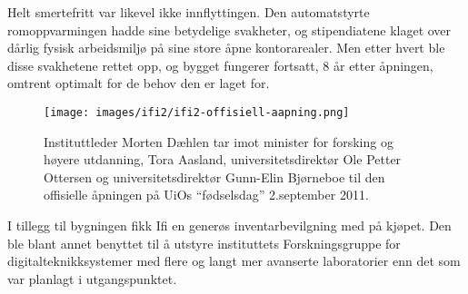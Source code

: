 Helt smertefritt var likevel ikke innflyttingen. Den automatstyrte romoppvarmingen hadde sine betydelige svakheter, og stipendiatene klaget over dårlig fysisk arbeidsmiljø på sine store åpne kontorarealer. Men etter hvert ble disse svakhetene rettet opp, og bygget fungerer fortsatt, 8 år etter åpningen, omtrent optimalt for de behov den er laget for.

\begin{figure}
	\texttt{[image: images/ifi2/ifi2-offisiell-aapning.png]}
	\caption{Instituttleder Morten Dæhlen tar imot minister for forsking og høyere utdanning, Tora Aasland, universitetsdirektør Ole Petter Ottersen og universitetsdirektør Gunn-Elin Bjørneboe til den offisielle åpningen på UiOs ``fødselsdag'' 2.september 2011.}
\end{figure}

I tillegg til bygningen fikk Ifi en generøs inventarbevilgning med på kjøpet. Den ble blant annet benyttet til å utstyre instituttets Forskningsgruppe for digitalteknikksystemer med flere og langt mer avanserte laboratorier enn det som var planlagt i utgangspunktet.
